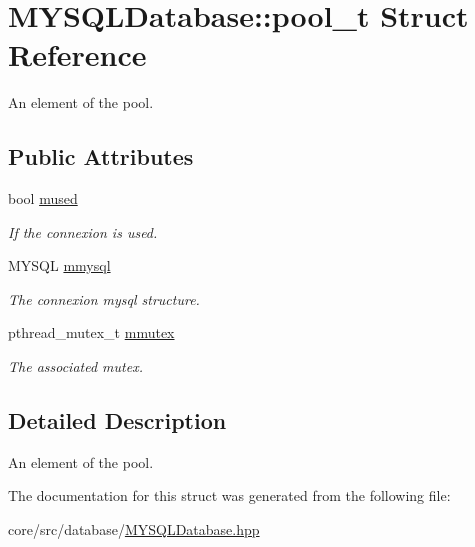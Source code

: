 \hypertarget{structMYSQLDatabase_1_1pool__t}{
\section{MYSQLDatabase::pool\_\-t Struct Reference}
\label{structMYSQLDatabase_1_1pool__t}
}


An element of the pool.  


\subsection*{Public Attributes}
\begin{DoxyCompactItemize}
\item 
\hypertarget{structMYSQLDatabase_1_1pool__t_ac7a9b13ff2dd5188479f78458f435055}{
bool \hyperlink{structMYSQLDatabase_1_1pool__t_ac7a9b13ff2dd5188479f78458f435055}{mused}}
\label{structMYSQLDatabase_1_1pool__t_ac7a9b13ff2dd5188479f78458f435055}

\begin{DoxyCompactList}\small\item\em If the connexion is used. \item\end{DoxyCompactList}\item 
\hypertarget{structMYSQLDatabase_1_1pool__t_a02c0ea818cd2a856ca87e4db38113a43}{
MYSQL \hyperlink{structMYSQLDatabase_1_1pool__t_a02c0ea818cd2a856ca87e4db38113a43}{mmysql}}
\label{structMYSQLDatabase_1_1pool__t_a02c0ea818cd2a856ca87e4db38113a43}

\begin{DoxyCompactList}\small\item\em The connexion mysql structure. \item\end{DoxyCompactList}\item 
\hypertarget{structMYSQLDatabase_1_1pool__t_a16c6b8c915d44b0248d37d4700d59b56}{
pthread\_\-mutex\_\-t \hyperlink{structMYSQLDatabase_1_1pool__t_a16c6b8c915d44b0248d37d4700d59b56}{mmutex}}
\label{structMYSQLDatabase_1_1pool__t_a16c6b8c915d44b0248d37d4700d59b56}

\begin{DoxyCompactList}\small\item\em The associated mutex. \item\end{DoxyCompactList}\end{DoxyCompactItemize}


\subsection{Detailed Description}
An element of the pool. 

The documentation for this struct was generated from the following file:\begin{DoxyCompactItemize}
\item 
core/src/database/\hyperlink{MYSQLDatabase_8hpp}{MYSQLDatabase.hpp}\end{DoxyCompactItemize}
